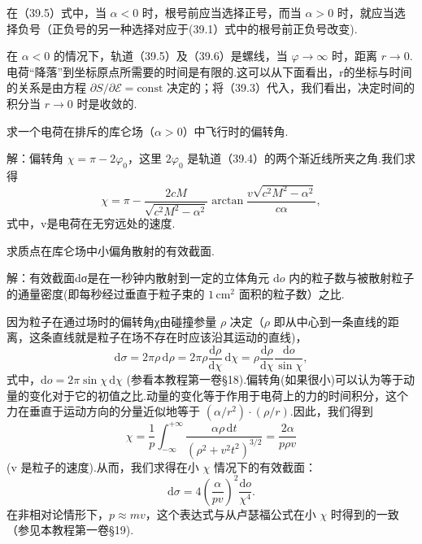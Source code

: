 在（39.5）式中，当 $\alpha < 0$ 时，根号前应当选择正号，而当 $\alpha > 0$ 时，就应当选择负号（正负号的另一种选择对应于(39.1）式中的根号前正负号改变).

在 $\alpha < 0$ 的情况下，轨道（39.5）及（39.6）是螺线，当 $\varphi\to\infty$ 时，距离 $r\to 0$.电荷“降落”到坐标原点所需要的时间是有限的.这可以从下面看出，r的坐标与时间的关系是由方程 $\partial S/\partial\mathcal{E}=\mathrm{const}$ 决定的；将（39.3）代入，我们看出，决定时间的积分当 $r\to 0$ 时是收敛的.

\begin{xiti}

\quad 求一个电荷在排斥的库仑场（$\alpha > 0$）中飞行时的偏转角.

解：偏转角 $\chi = \pi - 2\varphi_0$，这里 $2\varphi_0$ 是轨道（39.4）的两个渐近线所夹之角.我们求得
\begin{equation*}
  \chi=\pi-\frac{2cM}{\sqrt{c^2M^2-\alpha^2}}
  \arctan\frac{v\sqrt{c^2M^2-\alpha^2}}{c\alpha},
\end{equation*}
式中，v是电荷在无穷远处的速度.

\quad 求质点在库仑场中小偏角散射的有效截面.

解：有效截面dσ是在一秒钟内散射到一定的立体角元 $\mathrm{d}o$ 内的粒子数与被散射粒子的通量密度(即每秒经过垂直于粒子束的 $1\,\mathrm{cm}^2$ 面积的粒子数）之比.

因为粒子在通过场时的偏转角χ由碰撞参量 $\rho$ 决定（$\rho$ 即从中心到一条直线的距离，这条直线就是粒子在场不存在时应该沿其运动的直线)，
\begin{equation*}
  \mathrm{d}\sigma=2\pi\rho\,\mathrm{d}\rho
  =2\pi\rho\frac{\mathrm{d}\rho}{\mathrm{d}\chi}\,\mathrm{d}\chi
  =\rho\frac{\mathrm{d}\rho}{\mathrm{d}\chi}\frac{\mathrm{d}o}{\sin\chi},
\end{equation*}
式中，$\mathrm{d}o=2\pi\sin\chi\,\mathrm{d}\chi$ (参看本教程第一卷§18).偏转角(如果很小)可以认为等于动量的变化对于它的初值之比.动量的变化等于作用于电荷上的力的时间积分，这个力在垂直于运动方向的分量近似地等于 $(\alpha/r^2)\cdot(\rho/r)$.因此，我们得到
\begin{equation*}
  \chi=\frac{1}{p}\int_{-\infty}^{+\infty}
  \frac{\alpha\rho\,\mathrm{d}t}{(\rho^2+v^2t^2)^{3/2}}
  =\frac{2\alpha}{p\rho v}
\end{equation*}
(v 是粒子的速度).从而，我们求得在小 $\chi$ 情况下的有效截面：
\begin{equation*}
  \mathrm{d}\sigma=4\left(\frac{\alpha}{pv}\right)^2\frac{\mathrm{d}o}{\chi^4}.
\end{equation*}
在非相对论情形下，$p\approx mv$，这个表达式与从卢瑟福公式在小 $\chi$ 时得到的一致（参见本教程第一卷§19).

\end{xiti}

